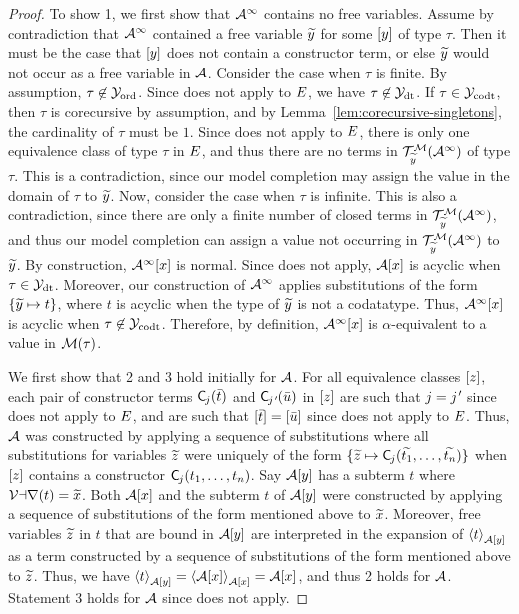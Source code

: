 \begin{report}
\begin{proof}
To show 1, we first show that $\Val^\AST$ contains no free variables.
Assume by contradiction that $\Val^\AST$ contained a free variable ${\Varec{y}}$ for some $\ec{y}$ of type $\tau$.
Then it must be the case that $\ec{y}$ does not contain a constructor term,
or else ${\Varec{y}}$ would not occur as a free variable in $\Val$.
Consider the case when $\tau$ is finite.
By assumption, $\tau \not\in \Nondata$.
Since  does not apply to $\Ec$, we have $\tau \not\in \Data$.
If $\tau \in \Codata$, then $\tau$ is corecursive by assumption, and by Lemma~\ref{lem:corecursive-singletons},
the cardinality of $\tau$ must be $1$.
Since  does not apply to $\Ec$,
there is only one equivalence class of type $\tau$ in $\Ec$,
and thus there are no terms in $\mathcal{T}^\M_{\Varec{y}}(\Val^\AST)$ of type $\tau$.
This is a contradiction, since our model completion may assign the value in the domain of $\tau$ to ${\Varec{y}}$.
Now, consider the case when $\tau$ is infinite.
This is also a contradiction,
since there are only a finite number of closed terms in $\mathcal{T}^\M_{\Varec{y}}(\Val^\AST)$,
and thus our model completion can assign a value not occurring in $\mathcal{T}^\M_{\Varec{y}}(\Val^\AST)$ to ${\Varec{y}}$.
By construction, $\Val^\AST \ec{x}$ is normal.
Since  does not apply, $\Val \ec{x}$ is acyclic when $\tau \in \Data$.
Moreover, our construction of $\Val^\AST$ applies substitutions of the form
$\{ {\Varec{y}} \mapsto t \}$, where $t$ is acyclic when the type of ${\Varec{y}}$ is not a codatatype.
Thus, $\Val^\AST \ec{x}$ is acyclic when $\tau \not\in \Codata$.
Therefore, by definition, $\Val^\AST \ec{x}$ is $\alpha$-equivalent to a value in $\M( \tau )$.

We first show that 2 and 3 hold initially for $\Val$.
For all equivalence classes $\ec{z}$,
each pair of constructor terms $\const{C}_{\negvthinspace j}( \vec t )$ and $\const{C}_{\negvthinspace\jPrime}( \vec u )$ in $\ec{z}$
are such that $j = \jPrime$ since  does not apply to $\Ec$,
and are such that $\ec{ \vec t } = \ec{ \vec u }$ since  does not apply to $\Ec$.
Thus, 
$\Val$ was constructed by applying a sequence of substitutions
where all substitutions for variables ${\Varec{z}}$ 
were uniquely of the form $\{ {\Varec{z}} \mapsto \const{C}_{\negvthinspace j}( {\Varec{t_1}}, \ldots, {\Varec{t_n}} ) \}$
when $\ec{z}$ contains a constructor $\const{C}_{\negvthinspace j}( t_1, \ldots, t_n )$.
Say $\Val \ec{y}$ has a subterm $t$ where $\muvar(t) = {\Varec{x}}$.
Both $\Val \ec{x}$ and the subterm $t$ of $\Val \ec{y}$ were
constructed by applying a sequence of substitutions of the form mentioned above to ${\Varec{x}}$.
Moreover, free variables ${\Varec{z}}$ in $t$ that are bound in $\Val \ec{y}$ are interpreted in 
the expansion of $\interp{\Val \ec{y}}{ t }$ as a term
constructed by a sequence of substitutions of the form mentioned above to ${\Varec{z}}$. 
Thus, we have
$\interp{\Val \ec{y}}{ t } = \interp{\Val \ec{x}}{ \Val \ec{x} } = \Val \ec{x}$, and thus 2 holds for $\Val$.
Statement 3 holds for $\Val$ since  does not apply.


\end{proof}
\end{report}

